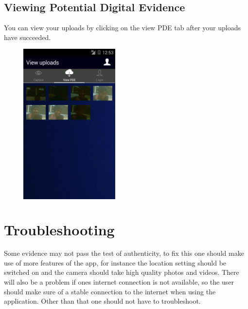 \documentclass[a4paper,12pt]{article}
\begin{document}
\subsection{Viewing Potential Digital Evidence}
You can view your uploads by clicking on the view PDE tab after your uploads have succeeded.
\begin{figure}[H]
\begin{center}
\includegraphics[width=50mm,scale=0.5]{images/screenshots/viewpde.png}
\end{center}
\end{figure}

\section{Troubleshooting}
Some evidence may not pass the test of authenticity, to fix this one should make use of more features of the app, for instance the location setting should be switched on and the camera should take high quality photos and videos. There will also be a problem if ones internet connection is not available, so the user should make sure of a stable connection to the internet when using the application. Other than that one should not have to troubleshoot.
\end{document}
